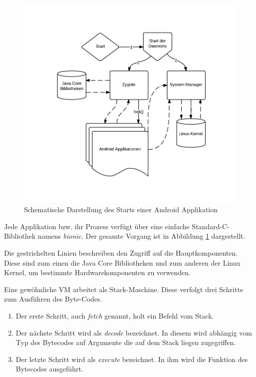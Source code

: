  \begin{figure}[h!t]
 \begin{center}
 \includegraphics[scale=0.5]{images/dvm}
 \caption{Schematische Darstellung des Starts einer Android Applikation}
 \label{dvm}
 \end{center}
 \end{figure}
 
 Jede Applikation bzw. ihr Prozess verfügt über eine einfache Standard-C-Bibliothek namens \textit{bionic}. Der gesamte Vorgang ist in Abbildung \ref{dvm} dargestellt.
 
 Die gestrichelten Linien beschreiben den Zugriff auf die Hauptkomponenten. Diese sind zum einen die Java Core Bibliotheken und zum anderen der Linux Kernel, um bestimmte Hardwarekomponenten zu verwenden.
 
 Eine gewöhnliche VM arbeitet als Stack-Maschine. Diese verfolgt drei Schritte zum Ausführen des Byte-Codes.

 \begin{enumerate}
    \item Der erste Schritt, auch \textit{fetch} genannt, holt ein Befehl vom Stack.
    \item Der nächste Schritt wird als \textit{decode} bezeichnet. In diesem wird abhängig vom Typ des Bytecodes auf Argumente die auf dem Stack liegen zugegriffen.
    \item Der letzte Schritt wird als \textit{execute} bezeichnet. In ihm wird die Funktion des Bytecodes ausgeführt.
 \end{enumerate}
 
